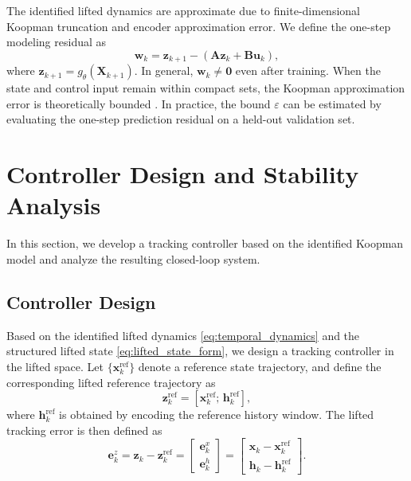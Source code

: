 \documentclass[journal]{IEEEtran}
\newcommand{\vx}{\mathbf{x}}
\newcommand{\vu}{\mathbf{u}}
\newcommand{\vz}{\mathbf{z}}
\newcommand{\vh}{\mathbf{h}}
\newcommand{\vw}{\mathbf{w}}
\newcommand{\ve}{\mathbf{e}}
\newcommand{\mA}{\mathbf{A}}
\newcommand{\mB}{\mathbf{B}}
\newcommand{\mX}{\mathbf{X}}
\begin{document}
The identified lifted dynamics are approximate due to finite-dimensional
Koopman truncation and encoder approximation error. We define the
one-step modeling residual as
\begin{equation}
    \vw_k = \vz_{k+1} - (\mA \vz_k + \mB \vu_k),
    \label{eq:modeling_error}
\end{equation}
where $\vz_{k+1} = g_\theta(\mX_{k+1})$. In general,
$\vw_k \neq \mathbf{0}$ even after training. When the state and control
input remain within compact sets, the Koopman approximation error is
theoretically bounded \cite{korda2018linear}. In practice, the bound
$\varepsilon$ can be estimated by evaluating the one-step prediction
residual on a held-out validation set.

\section{Controller Design and Stability Analysis}
\label{sec:control}

In this section, we develop a tracking controller based on the identified Koopman model and analyze the resulting closed-loop system.

\subsection{Controller Design}
\label{subsec:controller_design}

Based on the identified lifted dynamics \eqref{eq:temporal_dynamics} and the structured lifted state \eqref{eq:lifted_state_form}, we design a tracking controller in the lifted space. Let $\{\vx_k^{\mathrm{ref}}\}$ denote a reference state trajectory, and define the corresponding lifted reference trajectory as
\begin{equation}
    \vz_k^{\mathrm{ref}} = [\vx_k^{\mathrm{ref}};\,\vh_k^{\mathrm{ref}}],
    \label{eq:lifted_reference}
\end{equation}
where $\vh_k^{\mathrm{ref}}$ is obtained by encoding the reference history window. The lifted tracking error is then defined as
\begin{equation}
    \ve_k^z = \vz_k - \vz_k^{\mathrm{ref}}
    =
    \begin{bmatrix}
        \ve_k^x \\ \ve_k^h
    \end{bmatrix}
    =
    \begin{bmatrix}
        \vx_k - \vx_k^{\mathrm{ref}} \\
        \vh_k - \vh_k^{\mathrm{ref}}
    \end{bmatrix}.
    \label{eq:structured_error}
\end{equation}
\end{document}
